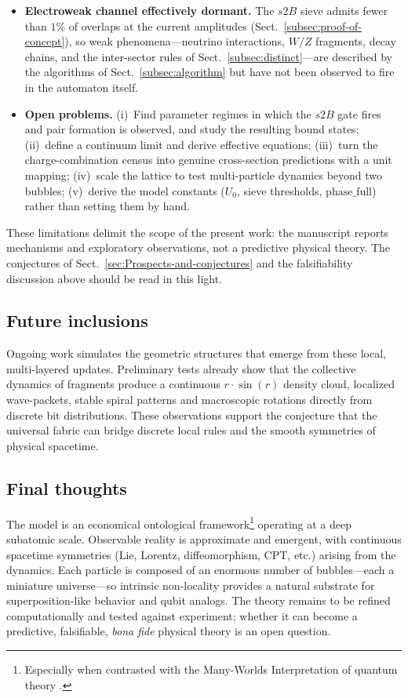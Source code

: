 \documentclass{ijuc}
\begin{document}
\begin{itemize}
  \item \textbf{Electroweak channel effectively dormant.}  The $s2B$ sieve admits fewer than $1\%$ of overlaps at the current amplitudes (Sect.~\ref{subsec:proof-of-concept}), so weak phenomena---neutrino interactions, $W/Z$ fragments, decay chains, and the inter-sector rules of Sect.~\ref{subsec:distinct}---are described by the algorithms of Sect.~\ref{subsec:algorithm} but have not been observed to fire in the automaton itself.
  \item \textbf{Open problems.}  (i)~Find parameter regimes in which the $s2B$ gate fires and pair formation is observed, and study the resulting bound states; (ii)~define a continuum limit and derive effective equations; (iii)~turn the charge-combination census into genuine cross-section predictions with a unit mapping; (iv)~scale the lattice to test multi-particle dynamics beyond two bubbles; (v)~derive the model constants ($U_{0}$, sieve thresholds, $\mathrm{phase\_full}$) rather than setting them by hand.
\end{itemize}

These limitations delimit the scope of the present work: the manuscript reports mechanisms and exploratory observations, not a predictive physical theory.  The conjectures of Sect.~\ref{sec:Prospects-and-conjectures} and the falsifiability discussion above should be read in this light.

\subsection{Future inclusions}

Ongoing work simulates the geometric structures that emerge from these local, multi-layered updates. Preliminary tests already show that the collective dynamics of fragments produce a continuous $r \cdot \sin(r)$ density cloud, localized wave-packets, stable spiral patterns and macroscopic rotations directly from discrete bit distributions. These observations support the conjecture that the universal fabric can bridge discrete local rules and the smooth symmetries of physical spacetime.

\subsection{Final thoughts}

The model is an economical ontological framework\footnote{Especially when contrasted with the Many-Worlds Interpretation of quantum theory \cite{everett1957}.} operating at a deep subatomic scale. Observable reality is approximate and emergent, with continuous spacetime symmetries (Lie, Lorentz, diffeomorphism, CPT, etc.) arising from the dynamics. Each particle is composed of an enormous number of bubbles—each a miniature universe—so intrinsic non-locality provides a natural substrate for superposition-like behavior and qubit analogs. The theory remains to be refined computationally and tested against experiment; whether it can become a predictive, falsifiable, \emph{bona fide} physical theory is an open question.
\end{document}
